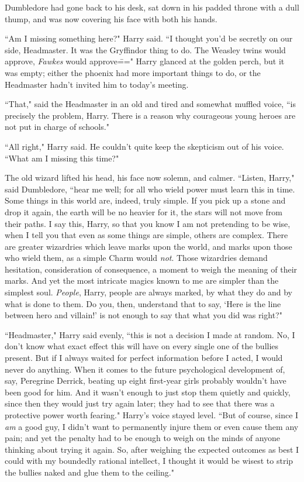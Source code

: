 Dumbledore had gone back to his desk, sat down in his padded throne with a dull thump, and was now covering his face with both his hands.

``Am I missing something here?" Harry said. ``I thought you'd be secretly on our side, Headmaster. It was the Gryffindor thing to do. The Weasley twins would approve, \emph{Fawkes} would approve\===" Harry glanced at the golden perch, but it was empty; either the phoenix had more important things to do, or the Headmaster hadn't invited him to today's meeting.

``That," said the Headmaster in an old and tired and somewhat muffled voice, ``is precisely the problem, Harry. There is a reason why courageous young heroes are not put in charge of schools."

``All right," Harry said. He couldn't quite keep the skepticism out of his voice. ``What am I missing this time?"

The old wizard lifted his head, his face now solemn, and calmer. ``Listen, Harry," said Dumbledore, ``hear me well; for all who wield power must learn this in time. Some things in this world are, indeed, truly simple. If you pick up a stone and drop it again, the earth will be no heavier for it, the stars will not move from their paths. I say this, Harry, so that you know I am not pretending to be wise, when I tell you that even as some things are simple, others are complex. There are greater wizardries which leave marks upon the world, and marks upon those who wield them, as a simple Charm would \emph{not}. Those wizardries demand hesitation, consideration of consequence, a moment to weigh the meaning of their marks. And yet the most intricate magics known to me are simpler than the simplest soul. \emph{People}, Harry, people are always marked, by what they do and by what is done to them. Do you, then, understand that to say, `Here is the line between hero and villain!' is not enough to say that what you did was right?"

``Headmaster," Harry said evenly, ``this is not a decision I made at random. No, I don't know what exact effect this will have on every single one of the bullies present. But if I always waited for perfect information before I acted, I would never do anything. When it comes to the future psychological development of, say, Peregrine Derrick, beating up eight first-year girls probably wouldn't have been good for him. And it wasn't enough to just stop them quietly and quickly, since then they would just try again later; they had to see that there was a protective power worth fearing." Harry's voice stayed level. ``But of course, since I \emph{am} a good guy, I didn't want to permanently injure them or even cause them any pain; and yet the penalty had to be enough to weigh on the minds of anyone thinking about trying it again. So, after weighing the expected outcomes as best I could with my boundedly rational intellect, I thought it would be wisest to strip the bullies naked and glue them to the ceiling."

